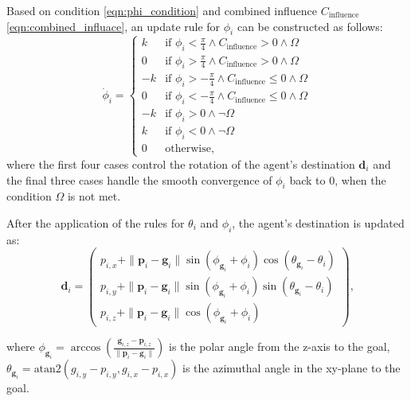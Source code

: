         Based on condition \eqref{eqn:phi_condition} and combined influence $C_{\text{influence}}$ \eqref{eqn:combined_influace}, an update rule for $\phi_i$ can be constructed as follows:
        \begin{equation}
            \label{eqn:phi_update}
            \dot{\phi}_i = 
            \begin{cases}
                k  & \text{if } \phi_i < \frac{\pi}{4} \land C_{\text{influence}} > 0 \land \Omega \\
                0  & \text{if } \phi_i > \frac{\pi}{4} \land C_{\text{influence}} > 0 \land \Omega \\
                -k & \text{if } \phi_i > -\frac{\pi}{4} \land C_{\text{influence}} \leq 0 \land \Omega \\
                0  & \text{if } \phi_i < -\frac{\pi}{4} \land C_{\text{influence}} \leq 0 \land \Omega \\
                -k & \text{if } \phi_i > 0 \land \neg \Omega \\
                k  & \text{if } \phi_i < 0 \land \neg \Omega \\
                0  & \text{otherwise}\text{,}
            \end{cases}
        \end{equation}
        where the first four cases control the rotation of the agent's destination $\mathbf{d}_i$ and the final three cases handle the smooth convergence of $\phi_i$ back to 0, when the condition $\Omega$ is not met. 

        After the application of the rules for $\theta_i$ and $\phi_i$, the agent's destination is updated as:
        \begin{equation}
            \label{eqn:destination_update}
            \mathbf{d}_i =
            \begin{pmatrix}
                p_{i,x} +  \|\mathbf{p}_i - \mathbf{g}_i\| \sin(\phi_{\mathbf{g}_i} + \phi_i)  \cos(\theta_{\mathbf{g}_i} - \theta_i) \\
                p_{i,y} + \|\mathbf{p}_i - \mathbf{g}_i\|  \sin(\phi_{\mathbf{g}_i} + \phi_i)  \sin(\theta_{\mathbf{g}_i} - \theta_i) \\
                p_{i,z} + \|\mathbf{p}_i - \mathbf{g}_i\| \cos(\phi_{\mathbf{g}_i} + \phi_i)
            \end{pmatrix}\text{,}
        \end{equation}

        where $\phi_{\mathbf{g}_i} = \arccos(\frac{\mathbf{g}_{i,z} - \mathbf{p}_{i,z}}{\|\mathbf{p}_i - \mathbf{g}_i\|})$ is the polar angle from the z-axis to the goal, 
        $\theta_{\mathbf{g}_i} = \text{atan2}( g_{i,y} - p_{i,y}, g_{i,x} - p_{i,x})$ is the azimuthal angle in the xy-plane to the goal.
    
